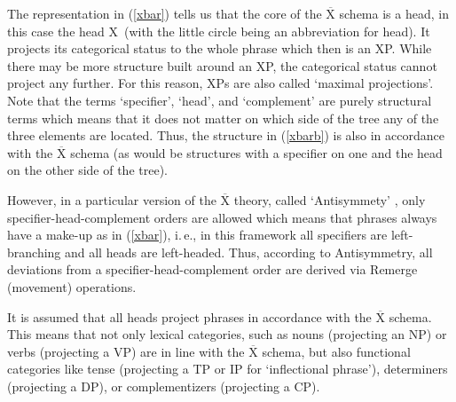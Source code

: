\noindent The representation in (\ref{xbar}) tells us that the core of the $\overline{\textrm{X}}$ schema is a head, in this case the head X\textdegree\ (with the little circle being an abbreviation for head). It projects its categorical status to the whole phrase which then is an XP. While there may be more structure built around an XP, the categorical status cannot project any further. For this reason, XPs are also called `maximal projections'. Note that the terms `specifier', `head', and `complement' are purely structural terms which means that it does not matter on which side of the tree any of the three elements are located. Thus, the structure in (\ref{xbarb}) is also in accordance with the $\overline{\textrm{X}}$ schema (as would be structures with a specifier on one and the head on the other side of the tree).

\begin{exe}
\ex\label{xbarb} 
\end{exe}

\noindent However, in a particular version of the $\overline{\textrm{X}}$ theory, called `Antisymmety' \citep{kayne1994antisymmetry}, only specifier-head-complement orders are allowed which means that phrases always have a make-up as in (\ref{xbar}), i.\,e., in this framework all specifiers are left-branching and all heads are left-headed. Thus, according to Antisymmetry, all deviations from a specifier-head-complement order are derived via Remerge (movement) operations. 

It is assumed that all heads project phrases in accordance with the $\overline{\textrm{X}}$ schema. This means that not only lexical categories, such as nouns (projecting an NP) or verbs (projecting a VP) are in line with the $\overline{\textrm{X}}$ schema, but also functional categories like tense (projecting a TP or IP for `inflectional phrase'), determiners (projecting a DP), or complementizers (projecting a CP). 
